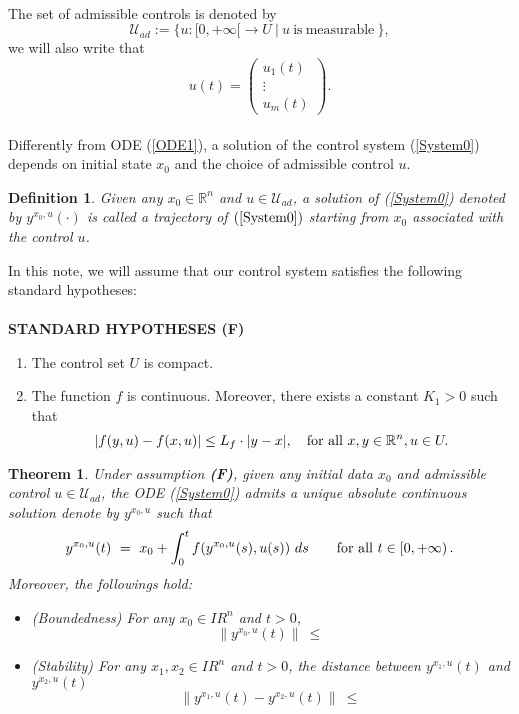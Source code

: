 \documentclass[letterpaper,12pt]{article}
\newtheorem{Definition}{Definition}[section]
\numberwithin{equation}{section}
\newcommand{\R}{\mathbb{R}}
\def\forall{\hbox{for all}~}
\def\R{I\!\!R}
\newtheorem{theorem}{Theorem}[section]
\begin{document}
\quad\\
The set of admissible controls is denoted by
\begin{equation}
\mathcal{U}_{ad}:=\big\lbrace{u:[0,+\infty[\rightarrow U\ |\ u\ \mathrm{is\ measurable}\ \big\rbrace},
\end{equation}
we will also write that 
\quad\\
\[
u(t)=
\begin{pmatrix}
u_1(t)\\
\vdots\\
u_m(t)
\end{pmatrix}
.
\]
\quad\\
Differently from ODE (\ref{ODE1}), a solution of the control system (\ref{System0}) depends on initial state $x_0$ and the choice of admissible control $u$. 
\begin{Definition}
Given any $x_0\in\mathbb{R}^n$ and $u\in\mathcal{U}_{ad}$, a solution of (\ref{System0}) denoted by $y^{x_0,u}(\cdot)$ is called a trajectory of $(\ref{System0})$ starting from $x_0$ associated with the control $u$.
\end{Definition}
In this note, we will assume that  our control system satisfies the following standard hypotheses:\\
\quad\\
\noindent \textbf{STANDARD HYPOTHESES (F)}  
\begin{enumerate}
\item[{\bf F1.}] The control set $U$ is compact.
\item[{\bf F2.}] The function $f$ is continuous. Moreover, there exists a constant $K_1>0$ such that 
\[
|f(y,u)-f(x,u)|\leq L_{f}\cdot |y-x|,\quad\forall x,y\in\mathbb{R}^n, u\in U.
\] 
\end{enumerate}
\begin{theorem} 
 Under assumption {\bf (F)}, given any initial data $x_0$ and admissible control $u\in\mathcal{U}_{ad}$, the ODE (\ref{System0}) admits a unique absolute continuous solution denote by $y^{x_0,u}$ such that 
 \[
 y^{x_0,u}(t)~=~x_0+\int_{0}^tf(y^{x_0,u}(s),u(s))~ds\qquad\forall t\in [0,+\infty)\,.
 \]
 Moreover, the followings hold:
 \begin{itemize}
 \item [(i)] (Boundedness) For any $x_0\in\R^n$ and $t>0$, 
 \[
 \|y^{x_0,u}(t)\|~\leq~
 \]
 \item [(ii)] (Stability) For any $x_1,x_2\in\R^n$ and $t>0$, the distance between $y^{x_1,u}(t)$ and $y^{x_2,u}(t)$
 \[
 \|y^{x_1,u}(t)-y^{x_2,u}(t)\|~\leq~
 \]
 \end{itemize}
\end{theorem}
\end{document}
